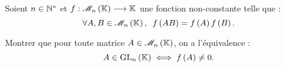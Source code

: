 \begin{corr}
\end{corr}

\begin{exo}[Exercice 12]
Soient \(n\in\mathbb{N}^*\) et \(f:\M{n}\to\K\) une fonction non-constante telle que : \[\quantifs{\forall A,B\in\M{n}}f\paren{AB}=f\paren{A}f\paren{B}.\]

Montrer que pour toute matrice \(A\in\M{n}\), on a l'équivalence : \[A\in\GL{n}\ssi f\paren{A}\not=0.\]
\end{exo}

\begin{corr}
\end{corr}